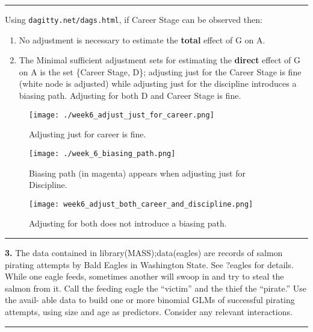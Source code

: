 \documentclass[]{article}
\begin{document}
\begin{center}\rule{0.5\linewidth}{0.5pt}\end{center}

Using \texttt{dagitty.net/dags.html}, if Career Stage can be observed
then:

\begin{enumerate}
\def\labelenumi{\arabic{enumi}.}
\item
  No adjustment is necessary to estimate the \textbf{total} effect of G
  on A.
\item
  The Minimal sufficient adjustment sets for estimating the
  \textbf{direct} effect of G on A is the set \{Career Stage, D\};
  adjusting just for the Career Stage is fine (white node is adjusted)
  while adjusting just for the discipline introduces a biasing path.
  Adjusting for both D and Career Stage is fine.
\end{enumerate}

\begin{figure}[htbp]
\centering
\texttt{[image: ./week6\_adjust\_just\_for\_career.png]}
\caption{Adjusting just for career is fine.}
\end{figure}

\begin{figure}[htbp]
\centering
\texttt{[image: ./week\_6\_biasing\_path.png]}
\caption{Biasing path (in magenta) appears when adjusting just for
Discipline.}
\end{figure}

\begin{figure}[htbp]
\centering
\texttt{[image: week6\_adjust\_both\_career\_and\_discipline.png]}
\caption{Adjusting for both does not introduce a biasing path.}
\end{figure}

\begin{center}\rule{0.5\linewidth}{0.5pt}\end{center}

\textbf{3.} The data contained in library(MASS);data(eagles) are records
of salmon pirating attempts by Bald Eagles in Washington State. See
?eagles for details. While one eagle feeds, sometimes another will swoop
in and try to steal the salmon from it. Call the feeding eagle the
``victim'' and the thief the ``pirate.'' Use the avail- able data to
build one or more binomial GLMs of successful pirating attempts, using
size and age as predictors. Consider any relevant interactions.

\begin{center}\rule{0.5\linewidth}{0.5pt}\end{center}
\end{document}
